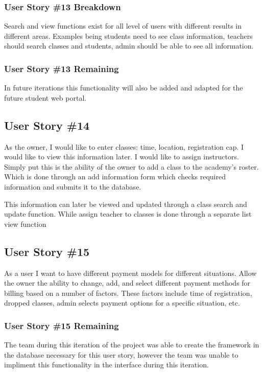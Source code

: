 \subsubsection{User Story \#13 Breakdown}
Search and view functions exist for all level of users with different results in different areas. Examples being students need to see class information, teachers should search classes and students, admin should be able to see all information.

\subsubsection{User Story \#13 Remaining}
In future iterations this functionality will also be added and adapted for the future student web portal.

\subsection{User Story \#14}
As the owner, I would like to enter classes: time, location, registration cap. I would like to view this information later. I would like to assign instructors. Simply put this is the ability of the owner to add a class to the academy's roster. Which is done through an add information form which checks required information and submits it to the database. 

This information can later be viewed and updated through a class search and update function. While assign teacher to classes is done through a separate list view function

\subsection{User Story \#15}
As a user I want to have different payment models for different situations. Allow the owner the ability to change, add, and select different payment methods for billing based on a number of factors. These factors include time of registration, dropped classes, admin selects payment options for a specific situation, etc.


\subsubsection{User Story \#15 Remaining}

The team during this iteration of the project was able to create the framework in the database necessary for this user story, however the team was unable to impliment this functionality in the interface during this iteration.

